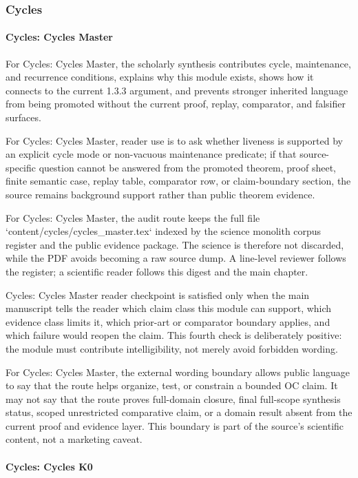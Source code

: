 \subsubsection{Cycles}

\paragraph{Cycles: Cycles Master}

For Cycles: Cycles Master, the scholarly synthesis contributes cycle, maintenance, and recurrence conditions, explains why this module exists, shows how it connects to the current 1.3.3 argument, and prevents stronger inherited language from being promoted without the current proof, replay, comparator, and falsifier surfaces.


For Cycles: Cycles Master, reader use is to ask whether liveness is supported by an explicit cycle mode or non-vacuous maintenance predicate; if that source-specific question cannot be answered from the promoted theorem, proof sheet, finite semantic case, replay table, comparator row, or claim-boundary section, the source remains background support rather than public theorem evidence.


For Cycles: Cycles Master, the audit route keeps the full file `content/cycles/cycles\_master.tex` indexed by the science monolith corpus register and the public evidence package. The science is therefore not discarded, while the PDF avoids becoming a raw source dump. A line-level reviewer follows the register; a scientific reader follows this digest and the main chapter.


Cycles: Cycles Master reader checkpoint is satisfied only when the main manuscript tells the reader which claim class this module can support, which evidence class limits it, which prior-art or comparator boundary applies, and which failure would reopen the claim. This fourth check is deliberately positive: the module must contribute intelligibility, not merely avoid forbidden wording.


For Cycles: Cycles Master, the external wording boundary allows public language to say that the route helps organize, test, or constrain a bounded OC claim. It may not say that the route proves full-domain closure, final full-scope synthesis status, scoped unrestricted comparative claim, or a domain result absent from the current proof and evidence layer. This boundary is part of the source's scientific content, not a marketing caveat.


\paragraph{Cycles: Cycles K0}


